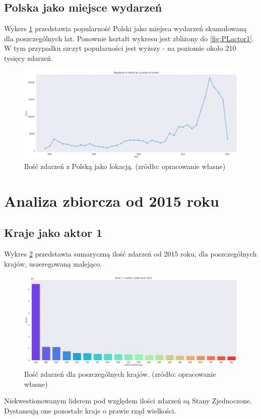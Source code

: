 \documentclass[11pt]{report}
\begin{document}
 \subsection{Polska jako miejsce wydarzeń}
 Wykers \ref{fig:PLlocation} przedstawia popularność Polski jako miejsca wydarzeń skumulowaną dla poszczególnych lat. Ponownie kształt wykresu jest zbliżony do \ref{fig:PLactor1}. W tym przypadku szczyt popularności jest wyższy - na poziomie około 210 tysięcy zdarzeń.
     \begin{figure}[ht]
	\centering
	\includegraphics[width=0.8 \textwidth]{fig/PL/PLlocation.png}
	\caption{Ilość zdarzeń z Polską jako lokacją. (zródło: opracowanie własne)}
	\label{fig:PLlocation}
	\end{figure}

 \section{Analiza zbiorcza od 2015 roku}
 \subsection{Kraje jako aktor 1}
 	Wykres \ref{fig:GLOBALactor1} przedstawia sumaryczną ilość zdarzeń od 2015 roku, dla poszczególnych krajów, uszeregowaną malejąco.
      \begin{figure}[ht]
	\centering
	\includegraphics[width=0.8 \textwidth]{fig/GLOBAL/Actor1.png}
	\caption{Ilość zdarzeń dla poszczególnych krajów. (zródło: opracowanie własne)}
	\label{fig:GLOBALactor1}
	\end{figure}
Niekwestionowanym liderem pod względem ilości zdarzeń są Stany Zjednoczone. Dystansują one pozostałe kraje o prawie rząd wielkości.
\end{document}
